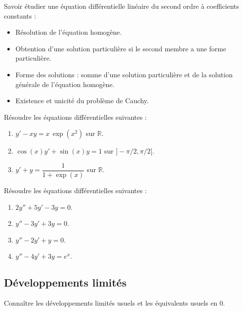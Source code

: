 \documentclass[a4paper,twoside,french,10pt]{VcCours}
\begin{document}
\begin{ptc}{}
	Savoir étudier une équation différentielle linéaire du second ordre à coefficients constants :
\begin{itemize} 
\item Résolution de l'équation homogène.
\item Obtention d'une solution particulière si le second membre a une forme particulière.
\item Forme des solutions : somme d'une solution particulière et de la solution générale de l'équation homogène.
\item Existence et unicité du problème de Cauchy.
\end{itemize}
\end{ptc}
\medskip

\begin{Exercice}{}\end{Exercice} Résoudre les équations différentielles suivantes : 

\begin{enumerate}
\item $y'-xy=x\,\exp(x^2)$ sur $\mathbb{R}$.
\item $\cos(x)y'+ \sin(x)y=1$ sur $]-\pi/2, \pi/2[$.
\item $y'+y=\dfrac{1}{1+\exp(x)}$ sur $\mathbb{R}$.
\end{enumerate}


\newpage


\begin{Exercice}{}\end{Exercice} Résoudre les équations différentielles suivantes :

\begin{multicols}{2}
\begin{enumerate}
\item $2y''+5y'-3y=0$.
\item $y''- 3y' + 3y=0$.
\columnbreak
\item $y''-2y'+y=0$.
\item $y''-4y'+3y=e^x$.
\end{enumerate}
\end{multicols}

\medskip

\subsection{Développements limités}

\begin{ptc}{}
	Connaître les développements limités usuels et les équivalents usuels en $0$.
\end{ptc}
%
%
\end{document}

